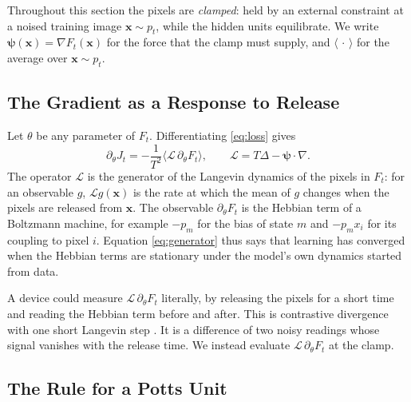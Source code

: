 \documentclass{article}
\newcommand{\x}{\bm{x}}
\newcommand{\gen}{\mathcal{L}}            %
\begin{document}
Throughout this section the pixels are \emph{clamped}: held by an external
constraint at a noised training image $\x\sim p_t$, while the hidden units
equilibrate. We write $\bm{\psi}(\x)=\nabla F_t(\x)$ for the force that the
clamp must supply, and $\langle\,\cdot\,\rangle$ for the average over
$\x\sim p_t$.

\subsection{The Gradient as a Response to Release}

Let $\theta$ be any parameter of $F_t$. Differentiating \eqref{eq:loss} gives
\begin{equation}
  \partial_\theta J_t = -\frac{1}{T^{2}}
     \bigl\langle \gen\,\partial_\theta F_t \bigr\rangle ,
  \qquad
  \gen = T\Delta - \bm{\psi}\!\cdot\!\nabla .
  \label{eq:generator}
\end{equation}
The operator $\gen$ is the generator of the Langevin dynamics of the pixels in
$F_t$: for an observable $g$, $\gen g(\x)$ is the rate at which the mean of
$g$ changes when the pixels are released from $\x$. The observable
$\partial_\theta F_t$ is the Hebbian term of a Boltzmann machine, for example
$-p_m$ for the bias of state $m$ and $-p_mx_i$ for its coupling to pixel $i$.
Equation \eqref{eq:generator} thus says that learning has converged when the
Hebbian terms are stationary under the model's own dynamics started from data.

A device could measure $\gen\,\partial_\theta F_t$ literally, by releasing the
pixels for a short time and reading the Hebbian term before and after. This is
contrastive divergence with one short Langevin step
\citep{hinton2002training,hyvarinen2007connections}. It is a difference of two
noisy readings whose signal vanishes with the release time. We instead
evaluate $\gen\,\partial_\theta F_t$ at the clamp.

\subsection{The Rule for a Potts Unit}
\end{document}
